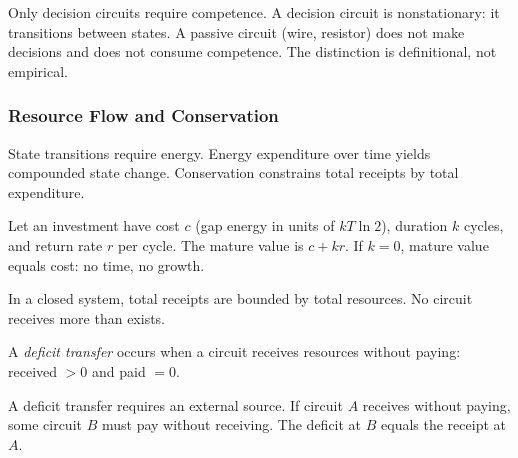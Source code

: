 \begin{remark}
Only decision circuits require competence. A decision circuit is nonstationary: it transitions between states. A passive circuit (wire, resistor) does not make decisions and does not consume competence. The distinction is definitional, not empirical.
\end{remark}

\subsubsection{Resource Flow and Conservation}\label{sec:resource-flow}

State transitions require energy. Energy expenditure over time yields compounded state change. Conservation constrains total receipts by total expenditure.

\begin{theorem}\label{thm:growth-time}
Let an investment have cost $c$ (gap energy in units of $kT\ln 2$), duration $k$ cycles, and return rate $r$ per cycle. The mature value is $c + kr$. If $k = 0$, mature value equals cost: no time, no growth.
\end{theorem}

\begin{theorem}[Conservation]\label{thm:conservation}
In a closed system, total receipts are bounded by total resources. No circuit receives more than exists.
\end{theorem}

\begin{definition}\label{def:deficit-transfer}
A \emph{deficit transfer} occurs when a circuit receives resources without paying: received $> 0$ and paid $= 0$.
\end{definition}

\begin{theorem}\label{thm:deficit-source}
A deficit transfer requires an external source. If circuit $A$ receives without paying, some circuit $B$ must pay without receiving. The deficit at $B$ equals the receipt at $A$.
\end{theorem}

